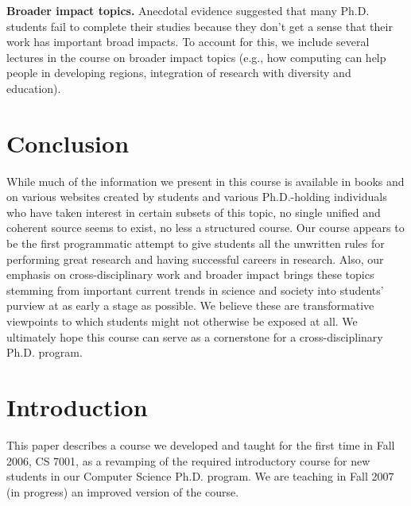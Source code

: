 \vspace*{0.1in}
\noindent
{\bf Broader impact topics.}  Anecdotal evidence suggested that many
Ph.D. students fail to complete their studies because they don't get a
sense that their work has important broad impacts.  To account for this,
we include several lectures in the course on broader impact topics
(e.g., how computing can help people in developing regions, integration
of research with diversity and education).  
\section{Conclusion}\label{sec:conclusion}

While much of the information we present in this course is available in
books and on various websites created by students and various
Ph.D.-holding individuals who have taken interest in certain subsets of
this topic, no single unified and coherent source seems to exist, no
less a structured course.  Our course appears to be the first
programmatic attempt to give students all the unwritten rules for
performing great research and having successful careers in research.
Also, our emphasis on cross-disciplinary work and broader impact brings
these topics stemming from important current trends in science and
society into students' purview at as early a stage as possible.  We
believe these are transformative viewpoints to which students might not
otherwise be exposed at all.  We ultimately hope this course can
serve as a cornerstone for a cross-disciplinary Ph.D. program.

\section{Introduction}

This paper describes a course we developed and taught for the first
time in Fall 2006, CS 7001, as a revamping of the required
introductory course for new students in our Computer Science Ph.D.
program.  We are teaching in Fall 2007 (in progress)
an improved version of the course.

